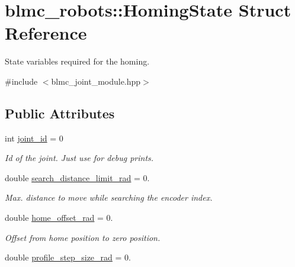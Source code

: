 \hypertarget{structblmc__robots_1_1HomingState}{}\section{blmc\+\_\+robots\+:\+:Homing\+State Struct Reference}
\label{structblmc__robots_1_1HomingState}


State variables required for the homing.  




{\ttfamily \#include $<$blmc\+\_\+joint\+\_\+module.\+hpp$>$}

\subsection*{Public Attributes}
\begin{DoxyCompactItemize}
\item 
int \hyperlink{structblmc__robots_1_1HomingState_a61557c9cbddb3183ccccafc456a1a00f}{joint\+\_\+id} = 0\hypertarget{structblmc__robots_1_1HomingState_a61557c9cbddb3183ccccafc456a1a00f}{}\label{structblmc__robots_1_1HomingState_a61557c9cbddb3183ccccafc456a1a00f}

\begin{DoxyCompactList}\small\item\em Id of the joint. Just use for debug prints. \end{DoxyCompactList}\item 
double \hyperlink{structblmc__robots_1_1HomingState_a3ce572a7b025bbdf1eaaa5b72dc11dde}{search\+\_\+distance\+\_\+limit\+\_\+rad} = 0.\hypertarget{structblmc__robots_1_1HomingState_a3ce572a7b025bbdf1eaaa5b72dc11dde}{}\label{structblmc__robots_1_1HomingState_a3ce572a7b025bbdf1eaaa5b72dc11dde}

\begin{DoxyCompactList}\small\item\em Max. distance to move while searching the encoder index. \end{DoxyCompactList}\item 
double \hyperlink{structblmc__robots_1_1HomingState_ad8ffa51d7885e6e83dd4b32354184175}{home\+\_\+offset\+\_\+rad} = 0.\hypertarget{structblmc__robots_1_1HomingState_ad8ffa51d7885e6e83dd4b32354184175}{}\label{structblmc__robots_1_1HomingState_ad8ffa51d7885e6e83dd4b32354184175}

\begin{DoxyCompactList}\small\item\em Offset from home position to zero position. \end{DoxyCompactList}\item 
double \hyperlink{structblmc__robots_1_1HomingState_a06b1c01870f9531cbe766728603f468b}{profile\+\_\+step\+\_\+size\+\_\+rad} = 0.\hypertarget{structblmc__robots_1_1HomingState_a06b1c01870f9531cbe766728603f468b}{}\label{structblmc__robots_1_1HomingState_a06b1c01870f9531cbe766728603f468b}


\end{DoxyCompactItemize}
